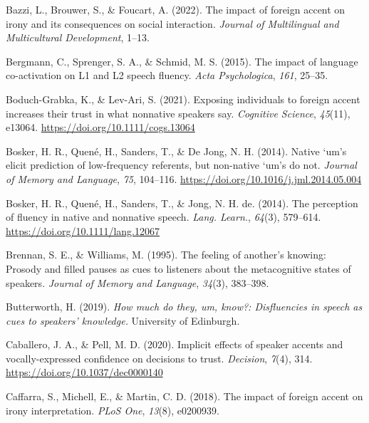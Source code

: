 \documentclass[
  man,floatsintext]{apa7}
\newlength{\cslhangindent}
\newlength{\cslentryspacingunit} %
\newenvironment{CSLReferences}[2] %
 {%
  \setlength{\parindent}{0pt}
  \ifodd #1
  \let\oldpar\par
  \def\par{\hangindent=\cslhangindent\oldpar}
  \fi
  \setlength{\parskip}{#2\cslentryspacingunit}
 }%
 {}
\begin{document}
\begin{CSLReferences}{1}{0}
\leavevmode{}%
Bazzi, L., Brouwer, S., \& Foucart, A. (2022). The impact of foreign accent on irony and its consequences on social interaction. \emph{Journal of Multilingual and Multicultural Development}, 1--13.

\leavevmode{}%
Bergmann, C., Sprenger, S. A., \& Schmid, M. S. (2015). The impact of language co-activation on {L1} and {L2} speech fluency. \emph{Acta {Psychologica}}, \emph{161}, 25--35.

\leavevmode{}%
Boduch-Grabka, K., \& Lev-Ari, S. (2021). Exposing individuals to foreign accent increases their trust in what nonnative speakers say. \emph{Cognitive Science}, \emph{45}(11), e13064. \url{https://doi.org/10.1111/cogs.13064}

\leavevmode{}%
Bosker, H. R., Quené, H., Sanders, T., \& De Jong, N. H. (2014). Native `um's elicit prediction of low-frequency referents, but non-native `um's do not. \emph{Journal of Memory and Language}, \emph{75}, 104--116. \url{https://doi.org/10.1016/j.jml.2014.05.004}

\leavevmode{}%
Bosker, H. R., Quené, H., Sanders, T., \& Jong, N. H. de. (2014). The perception of fluency in native and nonnative speech. \emph{Lang. Learn.}, \emph{64}(3), 579--614. \url{https://doi.org/10.1111/lang.12067}

\leavevmode{}%
Brennan, S. E., \& Williams, M. (1995). The feeling of another's knowing: Prosody and filled pauses as cues to listeners about the metacognitive states of speakers. \emph{Journal of Memory and Language}, \emph{34}(3), 383--398.

\leavevmode{}%
Butterworth, H. (2019). \emph{How much do they, um, know?: Disfluencies in speech as cues to speakers' knowledge.} University of Edinburgh.

\leavevmode{}%
Caballero, J. A., \& Pell, M. D. (2020). Implicit effects of speaker accents and vocally-expressed confidence on decisions to trust. \emph{Decision}, \emph{7}(4), 314. \url{https://doi.org/10.1037/dec0000140}

\leavevmode{}%
Caffarra, S., Michell, E., \& Martin, C. D. (2018). The impact of foreign accent on irony interpretation. \emph{{PLoS} One}, \emph{13}(8), e0200939.


\end{CSLReferences}
\end{document}
